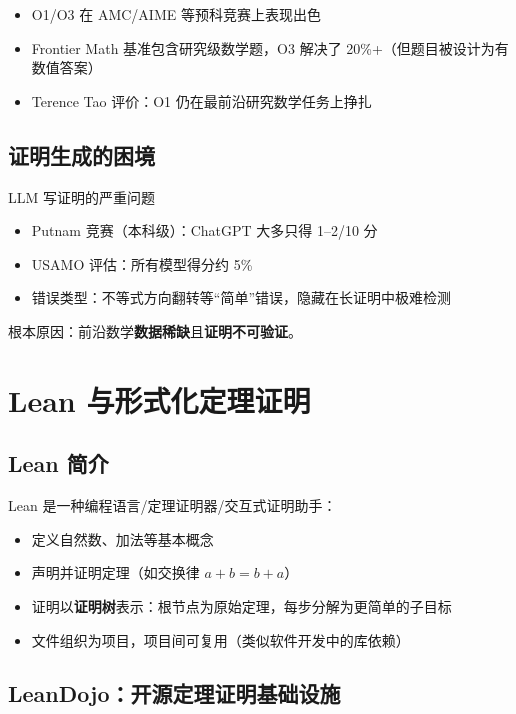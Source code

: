 \documentclass[a4paper]{article}
\begin{document}
\begin{itemize}
    \item O1/O3 在 AMC/AIME 等预科竞赛上表现出色
    \item Frontier Math 基准包含研究级数学题，O3 解决了 20\%+（但题目被设计为有数值答案）
    \item Terence Tao 评价：O1 仍在最前沿研究数学任务上挣扎
\end{itemize}

\subsection{证明生成的困境}

\begin{warningbox}{LLM 写证明的严重问题}
\begin{itemize}
    \item Putnam 竞赛（本科级）：ChatGPT 大多只得 1--2/10 分
    \item USAMO 评估：所有模型得分约 5\%
    \item 错误类型：不等式方向翻转等``简单''错误，隐藏在长证明中极难检测
\end{itemize}
根本原因：前沿数学\textbf{数据稀缺}且\textbf{证明不可验证}。
\end{warningbox}

\section{Lean 与形式化定理证明}

\subsection{Lean 简介}

Lean 是一种编程语言/定理证明器/交互式证明助手：
\begin{itemize}
    \item 定义自然数、加法等基本概念
    \item 声明并证明定理（如交换律 $a+b=b+a$）
    \item 证明以\textbf{证明树}表示：根节点为原始定理，每步分解为更简单的子目标
    \item 文件组织为项目，项目间可复用（类似软件开发中的库依赖）
\end{itemize}

\subsection{LeanDojo：开源定理证明基础设施}
\end{document}
